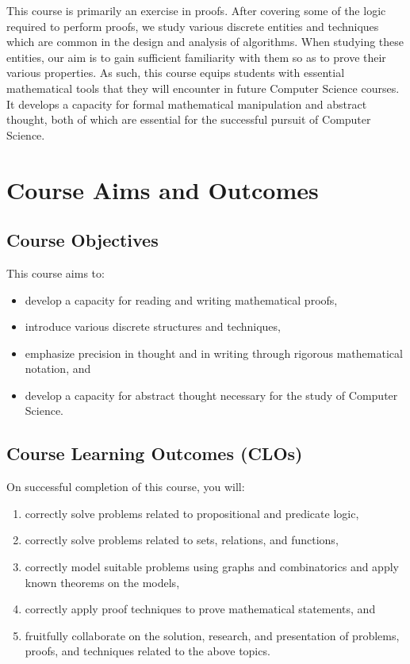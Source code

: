 \documentclass[a4paper]{article}
\begin{document}
This course is primarily an exercise in proofs. After covering some of the logic required to perform proofs, we study various discrete entities and techniques which are common in the design and analysis of algorithms.  When studying these entities, our aim is to gain sufficient familiarity with them so as to prove their various properties. As such, this course equips students with essential mathematical tools that they will encounter in future Computer Science courses.  It develops a capacity for formal mathematical manipulation and abstract thought, both of which are essential for the successful pursuit of Computer Science.

\section{Course Aims and Outcomes}

\subsection{Course Objectives}

This course aims to:
\begin{itemize}
\item develop a capacity for reading and writing mathematical proofs,
\item introduce various discrete structures and techniques,
\item emphasize precision in thought and in writing through rigorous mathematical notation, and
\item develop a capacity for abstract thought necessary for the study of Computer Science.
\end{itemize}

\subsection{Course Learning Outcomes (CLOs)}

On successful completion of this course, you will:
\begin{enumerate}
\item correctly solve problems related to propositional and predicate logic,
\item correctly solve problems related to sets, relations, and functions,
\item correctly model suitable problems using graphs and combinatorics and apply known theorems on the models,
\item correctly apply proof techniques to prove mathematical statements, and
\item fruitfully collaborate on the solution, research, and presentation of problems, proofs, and techniques related to the above topics.
\end{enumerate}
\end{document}
